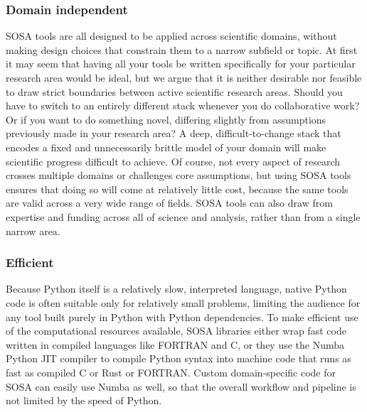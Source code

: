 \subsubsection{Domain independent}
SOSA tools are all designed to be applied across scientific domains, without making design choices that constrain them to a narrow subfield or topic. At first it may seem that having all your tools be written specifically for your particular research area would be ideal, but we argue that it is neither desirable nor feasible to draw strict boundaries between active scientific research areas. Should you have to switch to an entirely different stack whenever you do collaborative work? Or if you want to do something novel, differing slightly from assumptions previously made in your research area? A deep, difficult-to-change stack that encodes a fixed and unnecessarily brittle model of your domain will make scientific progress difficult to achieve. Of course, not every aspect of research crosses multiple domains or challenges core assumptions, but using SOSA tools ensures that doing so will come at relatively little cost, because the same tools are valid across a very wide range of fields. SOSA tools can also draw from expertise and funding across all of science and analysis, rather than from a single narrow area.

\subsubsection{Efficient}
Because Python itself is a relatively slow, interpreted language, native Python code is often suitable only for relatively small problems, limiting the audience for any tool built purely in Python with Python dependencies. To make efficient use of the computational resources available, SOSA libraries either wrap fast code written in compiled languages like FORTRAN and C, or they use the Numba Python JIT compiler to compile Python syntax into machine code that runs as fast as compiled C or Rust or FORTRAN. Custom domain-specific code for SOSA can easily use Numba as well, so that the overall workflow and pipeline is not limited by the speed of Python.

